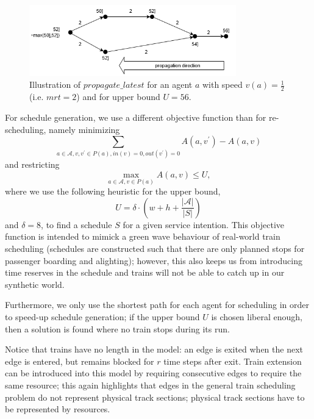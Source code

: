 \documentclass{article}
\begin{document}
\begin{figure}[hbtp]
	\centering
  \includegraphics[width=0.8\textwidth]{H1_propagate_latest.png}
	\caption{Illustration of $propagate\_latest$ for an agent $a$ with speed $v(a)=\frac{1}{2}$ (i.e. $mrt=2$) and for upper bound $U=56$.}
	\label{fig:propagate_latest}
\end{figure}





For schedule generation, we use a different objective function than for re-scheduling, namely minimizing
\begin{equation}
\sum_{a \in \mathcal{A}, v,v^\prime \in P(a), in(v)=0, out(v^\prime)=0} A(a,v^\prime) - A(a,v)    
\end{equation}
and restricting
\begin{equation}
\max_{a \in \mathcal{A}, v \in P(a)} A(a,v) \leq U,
\end{equation}
where we use the following heuristic for the upper bound,
\begin{equation}
U=\delta \cdot  \left(w + h + \frac{\left|\mathcal{A}\right|}{\left| S \right|} \right)
\end{equation}
and $\delta=8$,
to find a schedule $S$ for a given service intention. This objective function is intended to mimick a green wave behaviour of real-world train scheduling (schedules are constructed such that there are only planned stops for passenger boarding and alighting); however, this also keeps us from introducing time reserves in the schedule and trains will not be able to catch up in our synthetic world.

Furthermore, we only use the shortest path for each agent for scheduling in order to speed-up schedule generation; if the upper bound $U$ is chosen liberal enough, then a solution is found where no train stops during its run.


Notice that trains have no length in the model: an edge is exited when the next edge is entered, but remains blocked for $r$ time steps after exit. Train extension can be introduced into this model by requiring consecutive edges to require the same resource; this again highlights that edges in the general train scheduling problem do not represent physical track sections; physical track sections have to be represented by resources.
\end{document}
